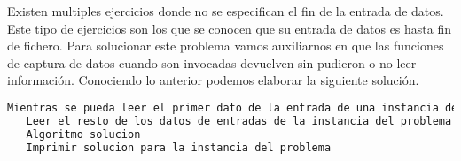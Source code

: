 Existen multiples ejercicios donde no se especifican el fin de la entrada de datos. Este tipo de ejercicios son los que se conocen que su entrada de datos es hasta fin de fichero. Para solucionar este problema vamos auxiliarnos en que las funciones de captura de datos cuando son invocadas devuelven sin pudieron o no leer información. Conociendo lo anterior podemos elaborar la siguiente solución.

\begin{lstlisting}[language=C++]
Mientras se pueda leer el primer dato de la entrada de una instancia del problema:
   Leer el resto de los datos de entradas de la instancia del problema
   Algoritmo solucion
   Imprimir solucion para la instancia del problema
\end{lstlisting}